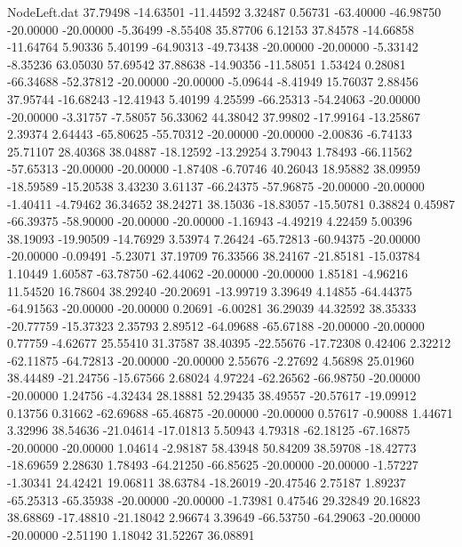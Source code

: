 \begin{filecontents}{NodeLeft.dat}
  37.79498  -14.63501  -11.44592     3.32487    0.56731  -63.40000  -46.98750  -20.00000  -20.00000   -5.36499   -8.55408   35.87706    6.12153
  37.84578  -14.66858  -11.64764     5.90336    5.40199  -64.90313  -49.73438  -20.00000  -20.00000   -5.33142   -8.35236   63.05030   57.69542
  37.88638  -14.90356  -11.58051     1.53424    0.28081  -66.34688  -52.37812  -20.00000  -20.00000   -5.09644   -8.41949   15.76037    2.88456
  37.95744  -16.68243  -12.41943     5.40199    4.25599  -66.25313  -54.24063  -20.00000  -20.00000   -3.31757   -7.58057   56.33062   44.38042
  37.99802  -17.99164  -13.25867     2.39374    2.64443  -65.80625  -55.70312  -20.00000  -20.00000   -2.00836   -6.74133   25.71107   28.40368
  38.04887  -18.12592  -13.29254     3.79043    1.78493  -66.11562  -57.65313  -20.00000  -20.00000   -1.87408   -6.70746   40.26043   18.95882
  38.09959  -18.59589  -15.20538     3.43230    3.61137  -66.24375  -57.96875  -20.00000  -20.00000   -1.40411   -4.79462   36.34652   38.24271
  38.15036  -18.83057  -15.50781     0.38824    0.45987  -66.39375  -58.90000  -20.00000  -20.00000   -1.16943   -4.49219    4.22459    5.00396
  38.19093  -19.90509  -14.76929     3.53974    7.26424  -65.72813  -60.94375  -20.00000  -20.00000   -0.09491   -5.23071   37.19709   76.33566
  38.24167  -21.85181  -15.03784     1.10449    1.60587  -63.78750  -62.44062  -20.00000  -20.00000    1.85181   -4.96216   11.54520   16.78604
  38.29240  -20.20691  -13.99719     3.39649    4.14855  -64.44375  -64.91563  -20.00000  -20.00000    0.20691   -6.00281   36.29039   44.32592
  38.35333  -20.77759  -15.37323     2.35793    2.89512  -64.09688  -65.67188  -20.00000  -20.00000    0.77759   -4.62677   25.55410   31.37587
  38.40395  -22.55676  -17.72308     0.42406    2.32212  -62.11875  -64.72813  -20.00000  -20.00000    2.55676   -2.27692    4.56898   25.01960
  38.44489  -21.24756  -15.67566     2.68024    4.97224  -62.26562  -66.98750  -20.00000  -20.00000    1.24756   -4.32434   28.18881   52.29435
  38.49557  -20.57617  -19.09912     0.13756    0.31662  -62.69688  -65.46875  -20.00000  -20.00000    0.57617   -0.90088    1.44671    3.32996
  38.54636  -21.04614  -17.01813     5.50943    4.79318  -62.18125  -67.16875  -20.00000  -20.00000    1.04614   -2.98187   58.43948   50.84209
  38.59708  -18.42773  -18.69659     2.28630    1.78493  -64.21250  -66.85625  -20.00000  -20.00000   -1.57227   -1.30341   24.42421   19.06811
  38.63784  -18.26019  -20.47546     2.75187    1.89237  -65.25313  -65.35938  -20.00000  -20.00000   -1.73981    0.47546   29.32849   20.16823
  38.68869  -17.48810  -21.18042     2.96674    3.39649  -66.53750  -64.29063  -20.00000  -20.00000   -2.51190    1.18042   31.52267   36.08891

\end{filecontents}

